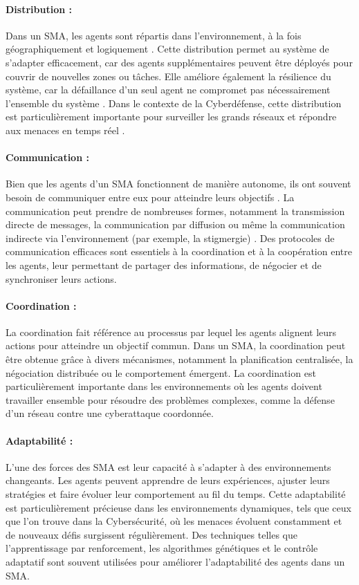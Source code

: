 \paragraph{Distribution :}
Dans un SMA, les agents sont répartis dans l'environnement, à la fois géographiquement et logiquement \cite{ferber1999multi}. Cette distribution permet au système de s'adapter efficacement, car des agents supplémentaires peuvent être déployés pour couvrir de nouvelles zones ou tâches. Elle améliore également la résilience du système, car la défaillance d'un seul agent ne compromet pas nécessairement l'ensemble du système \cite{durfee1999distributed}. Dans le contexte de la Cyberdéfense, cette distribution est particulièrement importante pour surveiller les grands réseaux et répondre aux menaces en temps réel \cite{shakarian2015cyber}.

\paragraph{Communication :}
Bien que les agents d'un SMA fonctionnent de manière autonome, ils ont souvent besoin de communiquer entre eux pour atteindre leurs objectifs \cite{huhns1999multiagent}. La communication peut prendre de nombreuses formes, notamment la transmission directe de messages, la communication par diffusion ou même la communication indirecte via l'environnement (par exemple, la stigmergie) \cite{dorigo2000ant}. Des protocoles de communication efficaces sont essentiels à la coordination et à la coopération entre les agents, leur permettant de partager des informations, de négocier et de synchroniser leurs actions.

\paragraph{Coordination :}
La coordination fait référence au processus par lequel les agents alignent leurs actions pour atteindre un objectif commun. Dans un SMA, la coordination peut être obtenue grâce à divers mécanismes, notamment la planification centralisée, la négociation distribuée ou le comportement émergent. La coordination est particulièrement importante dans les environnements où les agents doivent travailler ensemble pour résoudre des problèmes complexes, comme la défense d'un réseau contre une cyberattaque coordonnée.

\paragraph{Adaptabilité :}
L'une des forces des SMA est leur capacité à s'adapter à des environnements changeants. Les agents peuvent apprendre de leurs expériences, ajuster leurs stratégies et faire évoluer leur comportement au fil du temps. Cette adaptabilité est particulièrement précieuse dans les environnements dynamiques, tels que ceux que l'on trouve dans la Cybersécurité, où les menaces évoluent constamment et de nouveaux défis surgissent régulièrement. Des techniques telles que l'apprentissage par renforcement, les algorithmes génétiques et le contrôle adaptatif sont souvent utilisées pour améliorer l'adaptabilité des agents dans un SMA.

